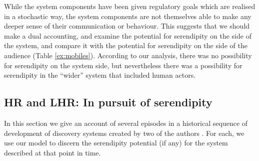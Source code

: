 While the system components have been given regulatory goals which are
realised in a
stochastic way, the
system components are not themselves able to make any deeper sense of
their communication or behaviour.  This suggests that we should make a
dual accounting, and examine the potential for serendipity on the
side of the system, and compare it with the potential for serendipity
on the side of the audience  (Table \ref{ex:mobiles}).
According to our analysis, there was no possibility for serendipity on
the system side, but nevertheless there was a possibility for
serendipity in the ``wider'' system that included human actors.



\subsection{{\sf HR} and {\sf LHR}: In pursuit of serendipity} \label{sec:pursuit}

In this section we give an account of several episodes in a historical sequence of development of discovery systems created by two of the authors \cite{colton2002automated,pease07}.  For each, we use our model to discern the serendipity potential (if any) for the system described at that point in time.

